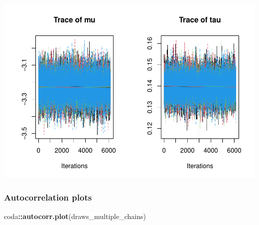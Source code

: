 \documentclass[
  11pt,
]{article}
\newenvironment{Shaded}{\begin{snugshade}}{\end{snugshade}}
\newcommand{\FunctionTok}[1]{\textcolor[rgb]{0.13,0.29,0.53}{\textbf{#1}}}
\newcommand{\NormalTok}[1]{#1}
\newcommand{\SpecialCharTok}[1]{\textcolor[rgb]{0.81,0.36,0.00}{\textbf{#1}}}
\begin{document}
\includegraphics{01-02-lec_files/figure-latex/trace-1.pdf}

\hypertarget{autocorrelation-plots}{%
\subsubsection{Autocorrelation plots}\label{autocorrelation-plots}}

\begin{Shaded}
\begin{Highlighting}[]
\NormalTok{coda}\SpecialCharTok{::}\FunctionTok{autocorr.plot}\NormalTok{(draws\_multiple\_chains)}
\end{Highlighting}
\end{Shaded}
\end{document}
